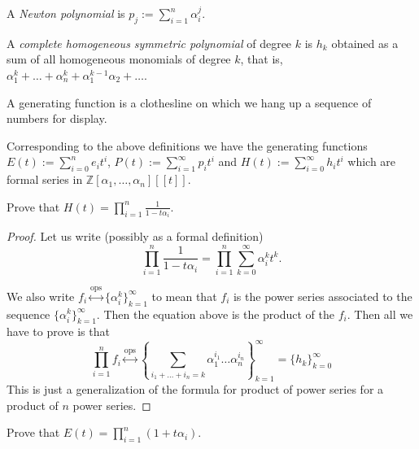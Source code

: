 \begin{definition}
\label{definition-Newton-polynomial}
A {\it Newton polynomial} is $p_j:=\sum_{i=1}^n\alpha_i^j$.
\end{definition}

\begin{definition}
\label{definition-complete-homogeneous-symmetric-polynomial}
A {\it complete homogeneous symmetric polynomial} of degree $k$ is $h_k$
obtained as a sum of all homogeneous monomials of degree $k$, that is,
$\alpha_1^k+\ldots+\alpha_n^k+\alpha_1^{k-1}\alpha_2+\ldots$.
\end{definition}

\begin{slogan}
\begin{reference}
\cite[p. 1]{generatingfunctionology}
\end{reference}
A generating function is a clothesline on which we hang up a sequence of numbers
for display.
\end{slogan}

\noindent
Corresponding to the above definitions we have the generating functions 
$E(t):=\sum_{i=0}^ne_it^i$, $P(t):=\sum_{i=1}^\infty p_it^i$ and 
$H(t):=\sum_{i=0}^\infty h_it^i$ which are formal series in 
$\mathbb{Z}[\alpha_1,\ldots,\alpha_n][\![t]\!]$.

\begin{exercise}
\label{exercise-H}
Prove that $H(t)=\prod_{i=1}^n\frac{1}{1-t\alpha_i}$.
\end{exercise}

\begin{proof}
Let us write (possibly as a formal definition)
$$
\prod_{i=1}^n\frac{1}{1-t\alpha_i}=\prod_{i=1}^n\sum_{k=0}^\infty\alpha_i^kt^k.
$$

We also write 
$f_i\overset{\text{ops}}{\longleftrightarrow}\{\alpha_i^k\}_{k=1}^\infty$ to mean
that $f_i$ is the power series associated to the sequence
$\{\alpha_i^k\}_{k=1}^\infty$. Then the equation above is the product of the
$f_i$. Then all we have to prove is that
$$
\prod_{i=1}^nf_i\overset{\text{ops}}{\longleftrightarrow}
\left\{\sum_{i_1+\ldots+i_n=k}\alpha_1^{i_1}\ldots\alpha_n^{i_n}\right\}
_{k=1}^\infty=\{h_k\}_{k=0}^\infty
$$
This is just a generalization of the formula for product of power series for a
product of $n$ power series.
\end{proof}

\begin{exercise}
\label{exercise-E}
Prove that $E(t)=\prod_{i=1}^n(1+t\alpha_i)$.
\end{exercise}

